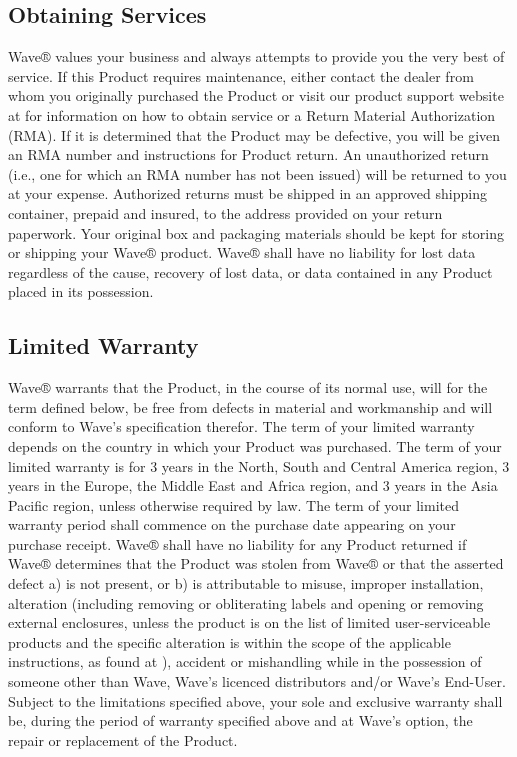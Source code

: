\documentclass[letterpaper,10pt,english]{sphinxmanual}
\begin{document}
\subsection{Obtaining Services}
\label{\detokenize{warranty:obtaining-services}}
Wave® values your business and always attempts to provide you the very best of service. If this Product requires maintenance, either contact the dealer from whom you originally purchased the Product or visit our product support website at  for information on how to obtain service or a Return Material Authorization (RMA). If it is determined that the Product may be defective, you will be given an RMA number and instructions for Product return. An unauthorized return (i.e., one for which an RMA number has not been issued) will be returned to you at your expense. Authorized returns must be shipped in an approved shipping container, prepaid and insured, to the address provided on your return paperwork. Your original box and packaging materials should be kept for storing or shipping your Wave® product.  Wave® shall have no liability for lost data regardless of the cause, recovery of lost data, or data contained in any Product placed in its possession.


\subsection{Limited Warranty}
\label{\detokenize{warranty:limited-warranty}}
Wave® warrants that the Product, in the course of its normal use, will for the term defined below, be free from defects in material and workmanship and will conform to Wave’s specification therefor. The term of your limited warranty depends on the country in which your Product was purchased. The term of your limited warranty is for 3 years in the North, South and Central America region, 3 years in the Europe, the Middle East and Africa region, and 3 years in the Asia Pacific region, unless otherwise required by law. The term of your limited warranty period shall commence on the purchase date appearing on your purchase receipt. Wave® shall have no liability for any Product returned if Wave® determines that the Product was stolen from Wave® or that the asserted defect a) is not present, or b) is attributable to misuse, improper installation, alteration (including removing or obliterating labels and opening or removing external enclosures, unless the product is on the list of limited user-serviceable products and the specific alteration is within the scope of the applicable instructions, as found at ), accident or mishandling while in the possession of someone other than Wave, Wave’s licenced distributors and/or Wave’s End-User. Subject to the limitations specified above, your sole and exclusive warranty shall be, during the period of warranty specified above and at Wave’s option, the repair or replacement of the Product.
\end{document}
